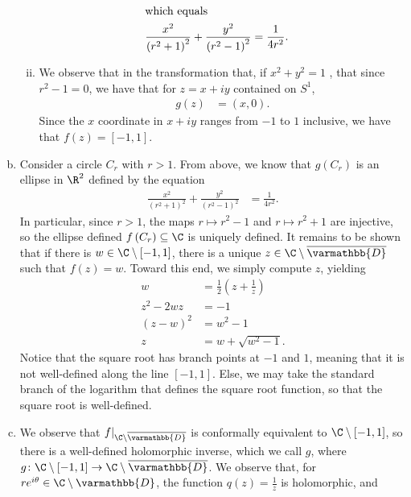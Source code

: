 \documentclass[10pt]{mypackage}
\renewcommand*{\mathbb}[1]{\varmathbb{#1}}
\begin{document}
\begin{solution}
\begin{enumerate}[(a)]
\begin{enumerate}[(i)]
\begin{align*}
            \intertext{which equals}
            \frac{x^2}{\left( r^2 + 1 \right)^2} + \frac{y^2}{\left( r^2 - 1 \right)^2} &= \frac{1}{4r^2}.
          \end{align*}
        \item We observe that in the transformation that, if $x^2 + y^2 = 1$ , that since $r^2 - 1 = 0$, we have that for $z = x + iy$ contained on $S^{1}$,
          \begin{align*}
            g\left( z \right) &= \left( x,0 \right).
          \end{align*}
          Since the $x$ coordinate in $x + iy$ ranges from $-1$ to $1$ inclusive, we have that $f\left( z \right) = \left[ -1,1 \right]$.
      \end{enumerate}
    \item Consider a circle $C_r$ with $r > 1$. From above, we know that $g\left( C_r \right)$ is an ellipse in $\R^{2}$ defined by the equation
      \begin{align*}
        \frac{x^2}{\left( r^2 + 1 \right)^2} + \frac{y^2}{\left( r^2 - 1 \right)^2} &= \frac{1}{4r^2}.
      \end{align*}
      In particular, since $r > 1$, the maps $r\mapsto r^2 - 1$ and $r \mapsto r^2 + 1$ are injective, so the ellipse defined $f\left( C_r \right)\subseteq \C$ is uniquely defined. It remains to be shown that if there is $w\in \C\setminus \left[ -1,1 \right]$, there is a unique $z\in \C\setminus \overline{\mathbb{D}}$ such that $f(z) = w$. Toward this end, we simply compute $z$, yielding
      \begin{align*}
        w &= \frac{1}{2}\left( z + \frac{1}{z} \right)\\
        z^2 - 2wz &= -1\\
        \left( z-w \right)^2 &= w^2 - 1\\
        z &= w + \sqrt{w^2 - 1}.
      \end{align*}
      Notice that the square root has branch points at $-1$ and $1$, meaning that it is not well-defined along the line $\left[ -1,1 \right]$. Else, we may take the standard branch of the logarithm that defines the square root function, so that the square root is well-defined.
    \item We observe that $f|_{\C\setminus \overline{ \mathbb{D} }}$ is conformally equivalent to $\C\setminus \left[ -1,1 \right]$, so there is a well-defined holomorphic inverse, which we call $g$, where $g\colon \C\setminus \left[ -1,1 \right] \rightarrow \C\setminus \overline{ \mathbb{D} }$. We observe that, for $re^{i\theta}\in \C\setminus \mathbb{D}$, the function $q(z) = \frac{1}{z}$ is holomorphic, and

\end{enumerate}
\end{solution}
\end{document}
